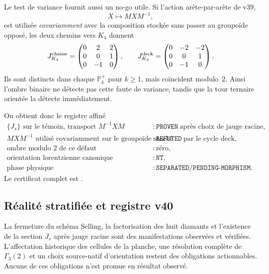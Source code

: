 \documentclass[11pt,a4paper]{article}
\newcommand{\certProven}{\texttt{PROVEN}}
\newcommand{\certRefuted}{\texttt{REFUTED}}
\newcommand{\certSeparated}{\texttt{SEPARATED}}
\newcommand{\certPending}{\texttt{PENDING-MORPHISM}}
\newcommand{\certNT}{\texttt{NT}}
\begin{document}
Le test de variance fournit aussi un no-go utile. Si l'action arête-par-arête de v39,
\[
 X\longmapsto MXM^{-1},
\]
est utilisée \emph{covariamment} avec la composition stockée sans passer au groupoïde opposé, les deux chemins vers $K_4$ donnent
\[
 J_{K_4}^{\rm chaine}
 =\begin{pmatrix}0&2&2\\0&0&1\\0&-1&0\end{pmatrix},
 \qquad
 J_{K_4}^{\rm deck}
 =\begin{pmatrix}0&-2&-2\\0&0&1\\0&-1&0\end{pmatrix}.
\]
Ils sont distincts dans chaque $\mathbb P_k^+$ pour $k\ge1$, mais coïncident modulo~$2$. Ainsi l'ombre binaire ne détecte pas cette faute de variance, tandis que la tour ternaire orientée la détecte immédiatement.

On obtient donc le registre affiné
\[
 \boxed{
 \begin{aligned}
 \{J_s\}\text{ sur le témoin, transport }M^{-1}XM &: \certProven\ \text{après choix de jauge racine},\\
 MXM^{-1}\text{ utilisé covariamment sur le groupoïde stocké} &: \certRefuted\ \text{par le cycle deck},\\
 \text{ombre modulo }2\text{ de ce défaut} &: \text{zéro},\\
 \text{orientation lorentzienne canonique} &: \certNT,\\
 \text{phase physique} &: \certSeparated/\certPending.
 \end{aligned}}
\]
Le certificat complet est .

\subsection{Réalité stratifiée et registre v40}

La fermeture du schéma Selling, la factorisation des huit diamants et l'existence de la section $J_s$ après jauge racine sont des manifestations observées et vérifiées. L'affectation historique des cellules de la planche, une résolution complète de $\Gamma_3(2)$ et un choix source-natif d'orientation restent des obligations actionnables. Aucune de ces obligations n'est promue en résultat observé.
\end{document}
